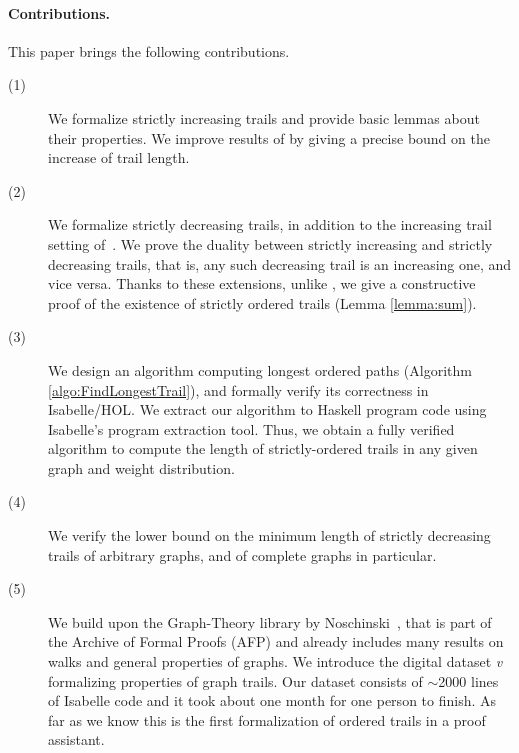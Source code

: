 \begin{isabellebody}
\begin{isamarkuptext}
\noindent\paragraph{\bf Contributions.} This paper brings the following contributions.
\begin{description}
\item[(1)]
We formalize strictly increasing trails and provide basic lemmas about their
properties. We improve results of \cite{graham1973increasing} by giving a precise bound on the increase of trail length.
\item[(2)] We formalize strictly decreasing trails, in addition to the increasing trail setting of~\cite{graham1973increasing}. 
We prove the duality between strictly increasing and strictly decreasing trails, that is, any such decreasing trail is an increasing one, and vice versa. 
Thanks to these extensions, unlike \cite{graham1973increasing},  we give a constructive proof of the existence of strictly ordered trails (Lemma \ref{lemma:sum}). 
\item[(3)] We design an algorithm computing longest ordered paths (Algorithm \ref{algo:FindLongestTrail}), and formally verify  its correctness in Isabelle/HOL.
We extract our algorithm to Haskell program code using Isabelle's program extraction tool. Thus, we obtain a fully verified algorithm to compute the length
of strictly-ordered trails in any given graph and weight distribution.
\item[(4)] We
verify the lower bound on
the minimum length of strictly decreasing trails of arbitrary graphs, and of complete graphs in particular.
\item[(5)] We build upon the Graph-Theory library by Noschinski~\cite{Graph_Theory-AFP},  that is part of the
Archive of Formal Proofs (AFP) and already includes many results on walks and
general properties of graphs. We introduce the digital dataset {\it v} formalizing properties of graph trails. Our dataset  consists of
$\sim$2000 lines of Isabelle code and it took about one month for one person to finish. As far as we know this is the first formalization of
ordered trails in a proof assistant.
\end{description}


\end{isamarkuptext}
\end{isabellebody}

